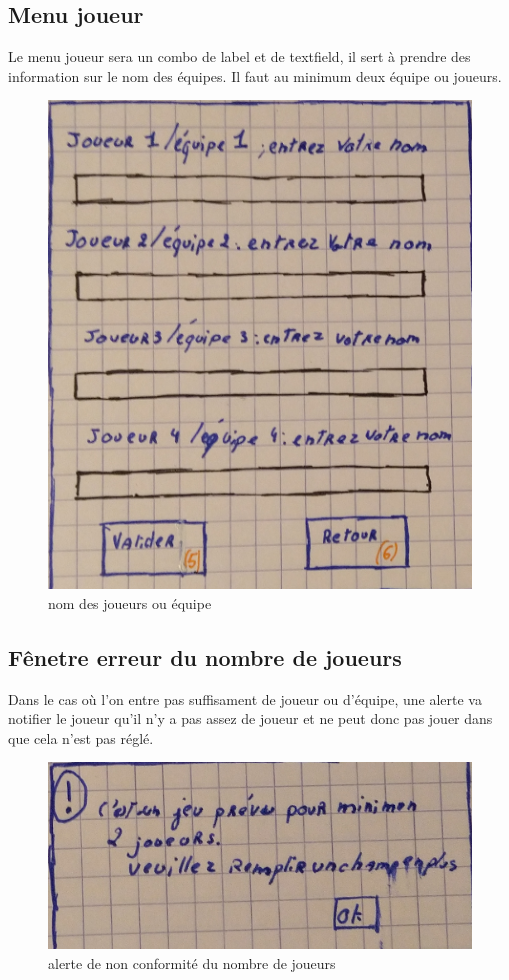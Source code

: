 \subsection{Menu joueur}
Le menu joueur sera un combo de label et de textfield, il sert à prendre des information sur le nom des équipes. Il faut au minimum deux équipe ou joueurs.
\begin{figure}[ht]
	\centering
	\includegraphics[scale=0.5]{menu_joueur.png}
	\caption{nom des joueurs ou équipe}
	\label{interface création d'équipe}
\end{figure} 

\newpage
\subsection{Fênetre erreur du nombre de joueurs}
Dans le cas où l'on entre pas suffisament de joueur ou d'équipe, une alerte va notifier le joueur qu'il n'y a pas assez de joueur et ne peut donc pas jouer dans que cela n'est pas réglé.
\begin{figure}[ht]
	\centering
	\includegraphics[scale=0.5]{fenetre_erreur_nb_joueur.png}
	\caption{alerte de non conformité du nombre de joueurs}
	\label{alerte du nombre de joueurs}
\end{figure}

